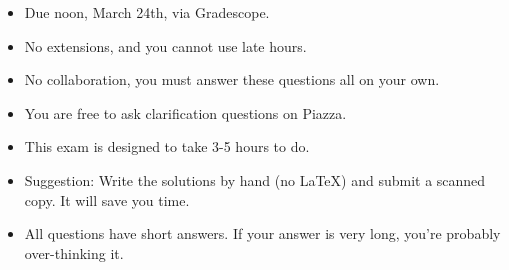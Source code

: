\newif\ifshowsolutions


\usepackage{url}


\newcommand{\fh}{\hat{f}}
\newcommand{\St}{\tilde{\Sigma}}
\newcommand{\Zt}{\tilde{Z}}
\newcommand{\Xt}{\tilde{X}}
\newcommand{\tr}{\texttt{trace}}
\newcommand{\yh}{\hat{y}}
\newcommand{\fb}{\bar{f}}



\pagestyle{fancy}

\begin{itemize}
\item Due noon, March 24th, via Gradescope.
\item No extensions, and you cannot use late hours.
\item No collaboration, you must answer these questions all on your own.
\item You are free to ask clarification questions on Piazza.
\item This exam is designed to take 3-5 hours to do.
\item Suggestion: Write the solutions by hand (no LaTeX) and submit a scanned copy.  It will save you time.
\item All questions have short answers.  If your answer is very long, you're probably over-thinking it.
\end{itemize}
\medskip


\newpage



\newpage


\newpage


\newpage



\newpage




